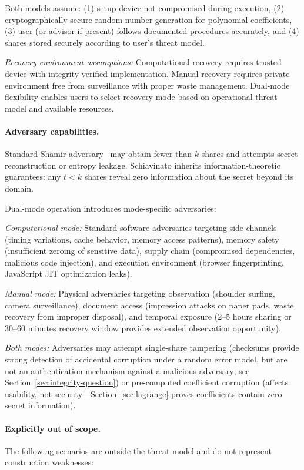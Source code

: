 \documentclass[11pt]{article}
\begin{document}
Both models assume: (1) setup device not compromised during execution, (2) cryptographically secure random number generation for polynomial coefficients, (3) user (or advisor if present) follows documented procedures accurately, and (4) shares stored securely according to user's threat model.

\textit{Recovery environment assumptions:} Computational recovery requires trusted device with integrity-verified implementation. Manual recovery requires private environment free from surveillance with proper waste management. Dual-mode flexibility enables users to select recovery mode based on operational threat model and available resources.

\paragraph{Adversary capabilities.} Standard Shamir adversary~\cite{shamir1979} may obtain fewer than $k$ shares and attempts secret reconstruction or entropy leakage. Schiavinato inherits information-theoretic guarantees: any $t < k$ shares reveal zero information about the secret beyond its domain.

Dual-mode operation introduces mode-specific adversaries:

\textit{Computational mode:} Standard software adversaries targeting side-channels (timing variations, cache behavior, memory access patterns), memory safety (insufficient zeroing of sensitive data), supply chain (compromised dependencies, malicious code injection), and execution environment (browser fingerprinting, JavaScript JIT optimization leaks).

\textit{Manual mode:} Physical adversaries targeting observation (shoulder surfing, camera surveillance), document access (impression attacks on paper pads, waste recovery from improper disposal), and temporal exposure (2--5 hours sharing or 30--60 minutes recovery window provides extended observation opportunity).

\textit{Both modes:} Adversaries may attempt single-share tampering (checksums provide strong detection of accidental corruption under a random error model, but are not an authentication mechanism against a malicious adversary; see Section~\ref{sec:integrity-question}) or pre-computed coefficient corruption (affects usability, not security—Section~\ref{sec:lagrange} proves coefficients contain zero secret information).

\paragraph{Explicitly out of scope.} The following scenarios are outside the threat model and do not represent construction weaknesses:
\end{document}
